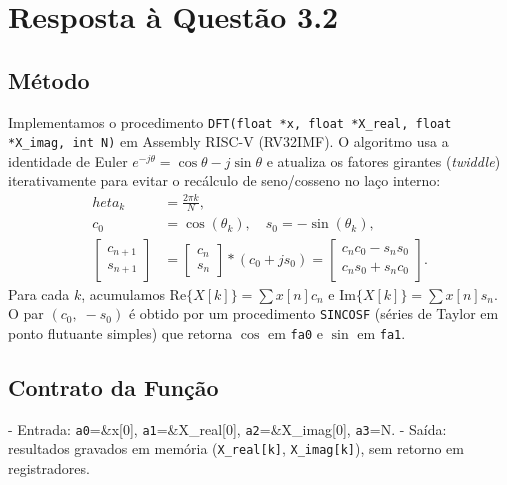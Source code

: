 \documentclass[12pt,a4paper]{article}
\begin{document}
\section*{Resposta à Questão 3.2}

\subsection*{Método}
Implementamos o procedimento \texttt{DFT(float *x, float *X\_real, float *X\_imag, int N)} em Assembly RISC-V (RV32IMF). O algoritmo usa a identidade de Euler $e^{-j\theta}=\cos\theta - j\sin\theta$ e atualiza os fatores girantes (\emph{twiddle}) iterativamente para evitar o recálculo de seno/cosseno no laço interno:
\begin{align*}
	heta_{k} 
&= \frac{2\pi k}{N}, \\
c_{0} 
&= \cos(\theta_{k}),\quad s_{0} = -\sin(\theta_{k}), \\
\begin{bmatrix} c_{n+1} \\ s_{n+1} \end{bmatrix}
&= \begin{bmatrix} c_{n} \\ s_{n} \end{bmatrix} * (c_{0} + j s_{0}) 
= \begin{bmatrix} c_{n}c_{0} - s_{n}s_{0} \\ c_{n}s_{0} + s_{n}c_{0} \end{bmatrix}.
\end{align*}
Para cada $k$, acumulamos $\mathrm{Re}\{X[k]\} = \sum x[n]c_{n}$ e $\mathrm{Im}\{X[k]\} = \sum x[n]s_{n}$. O par $(c_{0},\;\!-s_{0})$ é obtido por um procedimento \texttt{SINCOSF} (séries de Taylor em ponto flutuante simples) que retorna $\cos$ em \texttt{fa0} e $\sin$ em \texttt{fa1}.

\subsection*{Contrato da Função}
- Entrada: \texttt{a0}=\&x[0], \texttt{a1}=\&X\_real[0], \texttt{a2}=\&X\_imag[0], \texttt{a3}=N.
- Saída: resultados gravados em memória (\texttt{X\_real[k]}, \texttt{X\_imag[k]}), sem retorno em registradores.
\end{document}
